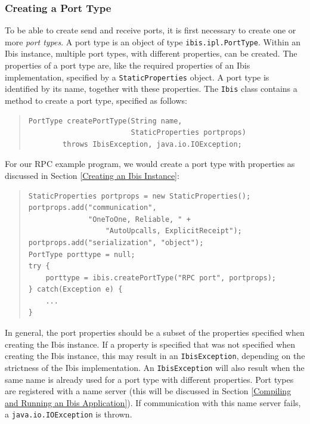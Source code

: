 \documentclass[10pt]{article}
\begin{document}
\subsubsection{Creating a Port Type}

To be able to create send and receive ports, it is first necessary
to create one or more \emph{port types}.
A port type is an object
of type \texttt{ibis.ipl.PortType}.
Within an Ibis instance,
multiple port types, with different properties, can be created.
The properties of a port type are, like the required properties
of an Ibis implementation, specified by a \texttt{StaticProperties} object.
A port type is identified by its name, together with these properties.
The \texttt{Ibis} class contains a method to create a port type,
specified as follows:
\begin{quote}
\begin{verbatim}
PortType createPortType(String name,
                        StaticProperties portprops)
        throws IbisException, java.io.IOException;
\end{verbatim}
\end{quote}

\noindent
For our RPC example program, we would create a port type with properties
as discussed in Section \ref{Creating an Ibis Instance}:

\begin{quote}
\begin{verbatim}
StaticProperties portprops = new StaticProperties();
portprops.add("communication",
              "OneToOne, Reliable, " + 
                  "AutoUpcalls, ExplicitReceipt");
portprops.add("serialization", "object");
PortType porttype = null;
try {
    porttype = ibis.createPortType("RPC port", portprops);
} catch(Exception e) {
    ...
}
\end{verbatim}
\end{quote}
\noindent
In general, the port properties should be a subset of the properties
specified when creating the Ibis instance. If a property is specified
that was not specified when creating the Ibis instance, this may
result in an \texttt{IbisException}, depending on the strictness of the
Ibis implementation.
An \texttt{IbisException} will also result when the same name is
already used for a port type with different properties.
Port types are registered with a name server
(this will be discussed in Section \ref{Compiling and Running an Ibis Application}).
If communication with this name server fails, a
\texttt{java.io.IOException} is thrown.
\end{document}
